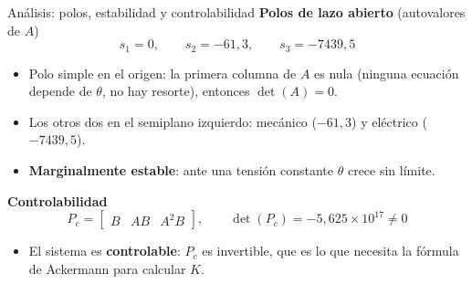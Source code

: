\documentclass[11pt,aspectratio=169]{beamer}
\begin{document}
\begin{frame}{Análisis: polos, estabilidad y controlabilidad}
  \textbf{Polos de lazo abierto} (autovalores de $A$)
  \[
    s_1 = 0,\qquad s_2 = -61{,}3,\qquad s_3 = -7439{,}5
  \]
  \begin{itemize}
    \item Polo simple en el origen: la primera columna de $A$ es nula (ninguna ecuación depende de $\theta$,
          no hay resorte), entonces $\det(A) = 0$.
    \item Los otros dos en el semiplano izquierdo: mecánico ($-61{,}3$) y eléctrico ($-7439{,}5$).
    \item \textbf{Marginalmente estable}: ante una tensión constante $\theta$ crece sin límite.
  \end{itemize}

  \vspace{0.6em}
  \textbf{Controlabilidad}
  \[
    P_c=\begin{bmatrix}B & AB & A^2B\end{bmatrix},\qquad
    \det(P_c) = -5{,}625\times10^{17}\neq 0
  \]
  \begin{itemize}
    \item El sistema es \textbf{controlable}: $P_c$ es invertible, que es lo que necesita la fórmula de
          Ackermann para calcular $K$.
  \end{itemize}
\end{frame}
\end{document}
